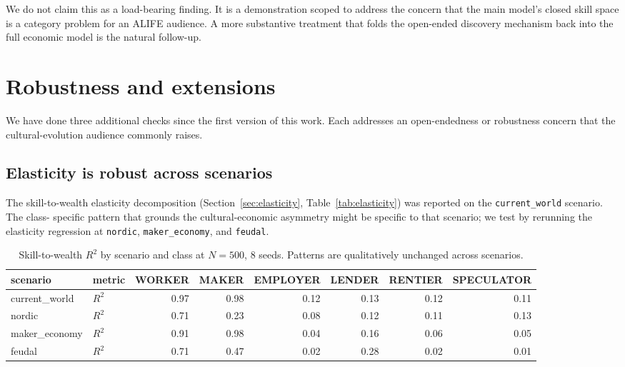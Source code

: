 \documentclass[11pt]{article}
\begin{document}
We do not claim this as a load-bearing finding. It is a
demonstration scoped to address the concern that the main model's
closed skill space is a category problem for an ALIFE audience. A
more substantive treatment that folds the open-ended discovery
mechanism back into the full economic model is the natural follow-up.

\section{Robustness and extensions}
\label{sec:robustness}

We have done three additional checks since the first version of
this work.  Each addresses an open-endedness or robustness concern
that the cultural-evolution audience commonly raises.

\subsection{Elasticity is robust across scenarios}
\label{sec:elasticity-robustness}

The skill-to-wealth elasticity decomposition
(Section~\ref{sec:elasticity}, Table~\ref{tab:elasticity}) was
reported on the \texttt{current\_world} scenario.  The class-
specific pattern that grounds the cultural-economic asymmetry
might be specific to that scenario; we test by rerunning the
elasticity regression at \texttt{nordic},
\texttt{maker\_economy}, and \texttt{feudal}.

\begin{table}[h]
\centering
\small
\caption{Skill-to-wealth $R^2$ by scenario and class at $N=500$,
8 seeds.  Patterns are qualitatively unchanged across scenarios.}
\label{tab:elasticity-scenarios}
\begin{tabular}{llrrrrrr}
\toprule
scenario & metric & WORKER & MAKER & EMPLOYER & LENDER & RENTIER & SPECULATOR \\
\midrule
current\_world & $R^2$ & 0.97 & 0.98 & 0.12 & 0.13 & 0.12 & 0.11 \\
nordic         & $R^2$ & 0.71 & 0.23 & 0.08 & 0.12 & 0.11 & 0.13 \\
maker\_economy & $R^2$ & 0.91 & 0.98 & 0.04 & 0.16 & 0.06 & 0.05 \\
feudal         & $R^2$ & 0.71 & 0.47 & 0.02 & 0.28 & 0.02 & 0.01 \\
\bottomrule
\end{tabular}
\end{table}
\end{document}
